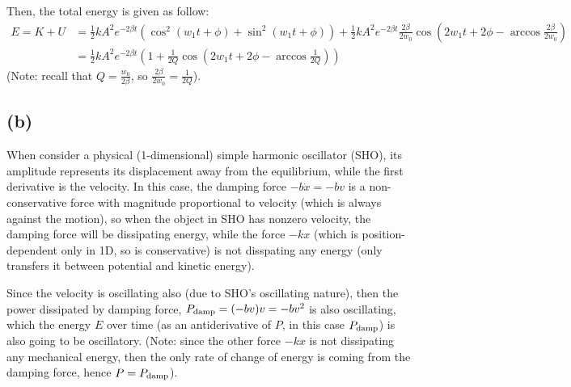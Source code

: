 \documentclass{article}
\begin{document}
Then, the total energy is given as follow:
\begin{align}
    E = K+U &= \frac{1}{2}kA^2e^{-2\beta t}(\cos^2(w_1t+\phi)+\sin^2(w_1t+\phi)) + \frac{1}{2}kA^2e^{-2\beta t}\frac{2\beta}{2w_0}\cos\left(2w_1t+2\phi-\arccos\frac{2\beta}{2w_0}\right)\\
    &= \frac{1}{2}kA^2e^{-2\beta t}\left(1+\frac{1}{2Q}\cos\left(2w_1t+2\phi-\arccos\frac{1}{2Q}\right)\right)
\end{align}
(Note: recall that $Q=\frac{w_0}{2\beta}$, so $\frac{2\beta}{2w_0} = \frac{1}{2Q}$).

\subsection*{(b)}
When consider a physical (1-dimensional) simple harmonic oscillator (SHO), its amplitude represents its displacement away from the equilibrium, while the first derivative is the velocity. In this case, the damping force $-b\dot x = -bv$ is a non-conservative force with magnitude proportional to velocity (which is always against the motion), so when the object in SHO has nonzero velocity, the damping force will be dissipating energy, while the force $-kx$ (which is position-dependent only in 1D, so is conservative) is not disspating any energy (only transfers it between potential and kinetic energy).

Since the velocity is oscillating also (due to SHO's oscillating nature), then the power dissipated by damping force, $P_\textmd{damp} = (-bv)v = -bv^2$ is also oscillating, which the energy $E$ over time (as an antiderivative of $P$, in this case $P_\textmd{damp}$) is also going to be oscillatory. 
(Note: since the other force $-kx$ is not dissipating any mechanical energy, then the only rate of change of energy is coming from the damping force, hence $P=P_\textmd{damp}$).
\end{document}
